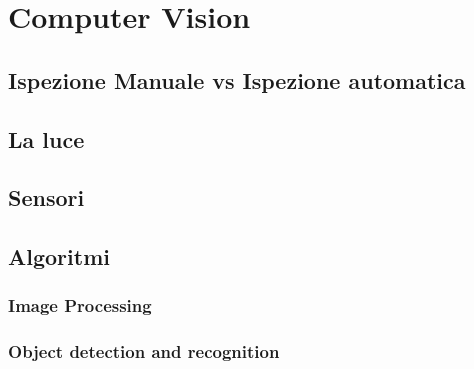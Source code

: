 \chapter{Computer Vision}
\section{Ispezione Manuale vs Ispezione automatica}
\section{La luce}
\section{Sensori}
\section{Algoritmi}
\subsection{Image Processing}
\subsection{Object detection and recognition}	